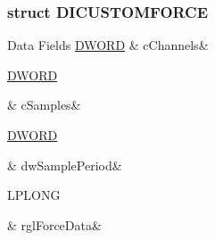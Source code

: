 \subsubsection{struct D\-I\-C\-U\-S\-T\-O\-M\-F\-O\-R\-C\-E}
\begin{DoxyFields}{Data Fields}
\hypertarget{a00003_a419d8e9792981764d69cdd3aa3340cdf}{\hyperlink{a00003_a50e15ae51c87ae06ab29c8148cb5f36c}{D\-W\-O\-R\-D}}\label{a00003_a419d8e9792981764d69cdd3aa3340cdf}
&
c\-Channels&
\\
\hline

\hypertarget{a00003_ae5a228ef62625d86ee614691e9e75b57}{\hyperlink{a00003_a50e15ae51c87ae06ab29c8148cb5f36c}{D\-W\-O\-R\-D}}\label{a00003_ae5a228ef62625d86ee614691e9e75b57}
&
c\-Samples&
\\
\hline

\hypertarget{a00003_a37f869306a4c4735b1e637b7f9bd5e44}{\hyperlink{a00003_a50e15ae51c87ae06ab29c8148cb5f36c}{D\-W\-O\-R\-D}}\label{a00003_a37f869306a4c4735b1e637b7f9bd5e44}
&
dw\-Sample\-Period&
\\
\hline

\hypertarget{a00003_a412b3c218909975ae7291435157f407f}{L\-P\-L\-O\-N\-G}\label{a00003_a412b3c218909975ae7291435157f407f}
&
rgl\-Force\-Data&
\\
\hline

\end{DoxyFields}
\label{de/de1/a00065}
\hypertarget{a00003_de/de1/a00065}{}
